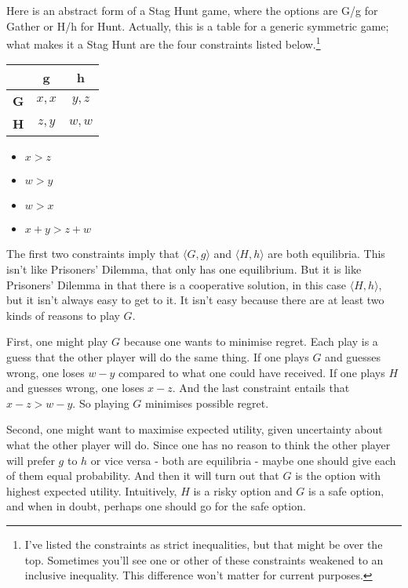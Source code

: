 \documentclass[
  12pt,
]{article}
\providecommand{\tightlist}{%
  \setlength{\itemsep}{0pt}\setlength{\parskip}{0pt}}
\begin{document}
Here is an abstract form of a Stag Hunt game, where the options are G/g
for Gather or H/h for Hunt. Actually, this is a table for a generic
symmetric game; what makes it a Stag Hunt are the four constraints
listed below.\footnote{I've listed the constraints as strict
  inequalities, but that might be over the top. Sometimes you'll see one
  or other of these constraints weakened to an inclusive inequality.
  This difference won't matter for current purposes.}

\begin{table}[H]
\centering
\begin{tabular}[t]{>{}r|cc}

\textbf{ } & \textbf{g} & \textbf{h}\\
\midrule
\textbf{G} & $x, x$ & $y, z$\\
\textbf{H} & $z, y$ & $w, w$\\

\end{tabular}
\end{table}

\begin{itemize}
\tightlist
\item
  \(x > z\)
\item
  \(w > y\)
\item
  \(w > x\)
\item
  \(x + y > z + w\)
\end{itemize}

The first two constraints imply that \(\langle G, g \rangle\) and
\(\langle H, h \rangle\) are both equilibria. This isn't like Prisoners'
Dilemma, that only has one equilibrium. But it is like Prisoners'
Dilemma in that there is a cooperative solution, in this case
\(\langle H, h \rangle\), but it isn't always easy to get to it. It
isn't easy because there are at least two kinds of reasons to play
\(G\).

First, one might play \(G\) because one wants to minimise regret. Each
play is a guess that the other player will do the same thing. If one
plays \(G\) and guesses wrong, one loses \(w - y\) compared to what one
could have received. If one plays \(H\) and guesses wrong, one loses
\(x - z\). And the last constraint entails that \(x - z > w - y\). So
playing \(G\) minimises possible regret.

Second, one might want to maximise expected utility, given uncertainty
about what the other player will do. Since one has no reason to think
the other player will prefer \(g\) to \(h\) or vice versa - both are
equilibria - maybe one should give each of them equal probability. And
then it will turn out that \(G\) is the option with highest expected
utility. Intuitively, \(H\) is a risky option and \(G\) is a safe
option, and when in doubt, perhaps one should go for the safe option.
\end{document}

